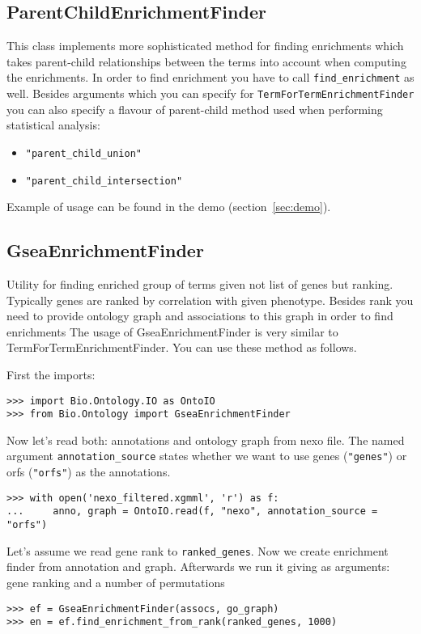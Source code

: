 \subsection{ParentChildEnrichmentFinder}
This class implements more sophisticated method for finding
enrichments which takes parent-child relationships between
the terms into account when computing the enrichments.
In order to find enrichment you have to call \verb|find_enrichment| as
well. 
Besides arguments which you can specify for
\verb|TermForTermEnrichmentFinder| you can also specify a flavour of
parent-child method used when performing statistical analysis:
\begin{itemize}
\item \verb|"parent_child_union"|
\item \verb|"parent_child_intersection"|
\end{itemize}

Example of usage can be found in the demo (section~\ref{sec:demo}).
\subsection{GseaEnrichmentFinder}

Utility for finding enriched group of terms given not list of genes
but ranking. Typically genes are ranked by correlation with given
phenotype. Besides rank you need to provide ontology graph and
associations to this graph in order to find enrichments
The usage of GseaEnrichmentFinder is very similar to
TermForTermEnrichmentFinder. You can use these method as follows.

First the imports:
\begin{verbatim}
>>> import Bio.Ontology.IO as OntoIO
>>> from Bio.Ontology import GseaEnrichmentFinder
\end{verbatim}

Now let's read both: annotations and ontology graph from nexo file. The named
argument \verb|annotation_source| states whether we want to use genes (\verb|"genes"|)
or orfs (\verb|"orfs"|) as the annotations.

\begin{verbatim}
>>> with open('nexo_filtered.xgmml', 'r') as f:
...     anno, graph = OntoIO.read(f, "nexo", annotation_source = "orfs")
\end{verbatim}

Let's assume we read gene rank to \verb|ranked_genes|.
Now we create enrichment finder from annotation and graph. Afterwards we run it
giving as arguments: gene ranking and a number of permutations
\begin{verbatim}
>>> ef = GseaEnrichmentFinder(assocs, go_graph)
>>> en = ef.find_enrichment_from_rank(ranked_genes, 1000)
\end{verbatim}

